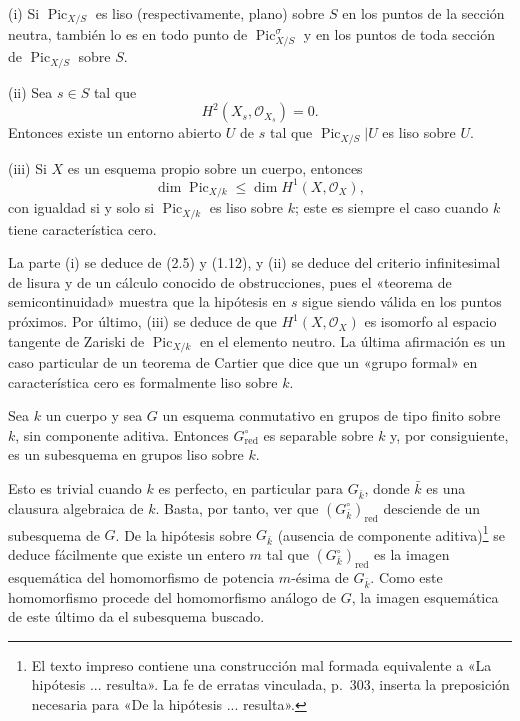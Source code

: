 
\noindent(i) Si $\operatorname{Pic}_{X/S}$ es liso (respectivamente, plano)
sobre $S$ en los puntos de la sección neutra, también lo es en todo punto de
$\operatorname{Pic}_{X/S}^\sigma$ y en los puntos de toda sección de
$\operatorname{Pic}_{X/S}$ sobre $S$.

\noindent(ii) Sea $s\in S$ tal que
\[
H^2(X_s,\mathcal O_{X_s})=0.
\]
Entonces existe un entorno abierto $U$ de $s$ tal que
$\operatorname{Pic}_{X/S}|U$ es liso sobre $U$.

\noindent(iii) Si $X$ es un esquema propio sobre un cuerpo, entonces
\[
\dim\operatorname{Pic}_{X/k}\leq\dim H^1(X,\mathcal O_X),
\]
con igualdad si y solo si $\operatorname{Pic}_{X/k}$ es liso sobre $k$; este
es siempre el caso cuando $k$ tiene característica cero.

La parte (i) se deduce de (2.5) y (1.12), y (ii) se deduce del criterio
infinitesimal de lisura y de un cálculo conocido de obstrucciones, pues el
«teorema de semicontinuidad» muestra que la hipótesis en $s$ sigue siendo
válida en los puntos próximos. Por último, (iii) se deduce de que
$H^1(X,\mathcal O_X)$ es isomorfo al espacio tangente de Zariski de
$\operatorname{Pic}_{X/k}$ en el elemento neutro. La última afirmación es un
caso particular de un teorema de Cartier que dice que un «grupo formal» en
característica cero es formalmente liso sobre $k$.


 Sea $k$ un cuerpo y sea $G$ un esquema conmutativo en
grupos de tipo finito sobre $k$, sin componente aditiva. Entonces
$G_{\mathrm{red}}^\circ$ es separable sobre $k$ y, por consiguiente, es un
subesquema en grupos liso sobre $k$.

Esto es trivial cuando $k$ es perfecto, en particular para $G_{\bar k}$, donde
$\bar k$ es una clausura algebraica de $k$. Basta, por tanto, ver que
$(G_{\bar k}^\circ)_{\mathrm{red}}$ desciende de un subesquema de $G$. De la
hipótesis sobre $G_{\bar k}$ (ausencia de componente aditiva)\footnote{El texto
impreso contiene una construcción mal formada equivalente a «La hipótesis ...
resulta». La fe de erratas vinculada, p.~303, inserta la preposición necesaria
para «De la hipótesis ... resulta».} se deduce fácilmente que existe un entero
$m$ tal que $(G_{\bar k}^\circ)_{\mathrm{red}}$ es la imagen esquemática del
homomorfismo de potencia $m$-ésima de $G_{\bar k}$. Como este homomorfismo
procede del homomorfismo análogo de $G$, la imagen esquemática de este último
da el subesquema buscado.

